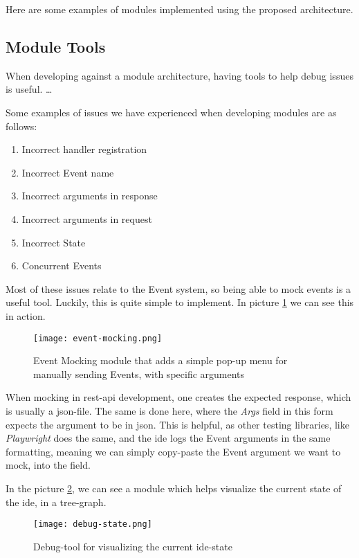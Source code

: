 Here are some examples of modules implemented using the proposed architecture.


\subsection{Module Tools}

When developing against a module architecture, having tools to help debug issues
is useful. \dots

Some examples of issues we have experienced when developing modules are as
follows:

\begin{enumerate}
  \item Incorrect handler registration
  \item Incorrect Event name
  \item Incorrect arguments in response
  \item Incorrect arguments in request
  \item Incorrect State
  \item Concurrent Events
\end{enumerate}

Most of these issues relate to the Event system, so being able to mock events
is a useful tool. Luckily, this is quite simple to implement. In
picture \ref{pic:eventMock} we can see this in action.

\begin{figure}[H]
  \centering
  \texttt{[image: event-mocking.png]}
  \caption{
    Event Mocking module that adds a simple pop-up menu for manually sending
    Events, with specific arguments
  }
  \label{pic:eventMock}
\end{figure}

When mocking in \gls{rest}-\gls{api} development, one creates the expected
response, which is usually a \gls{json}-file. The same is done here, where the
\textit{Args} field in this form expects the argument to be in \gls{json}. This
is helpful, as other testing libraries, like \textit{Playwright} does the same,
and the \gls{ide} logs the Event arguments in the same formatting, meaning we
can simply copy-paste the Event argument we want to mock, into the field.

In the picture \ref{pic:debugState}, we can see a module which helps visualize
the current state of the \gls{ide}, in a tree-graph.

\begin{figure}[H]
  \centering
  \texttt{[image: debug-state.png]}
  \caption{
    Debug-tool for visualizing the current \gls{ide}-state
  }
  \label{pic:debugState}
\end{figure}

